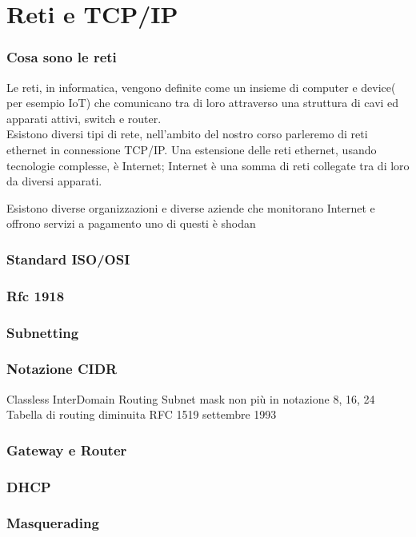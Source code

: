 \chapter{Reti e TCP/IP}	 %

\subsection{Cosa sono le reti}
Le reti, in informatica, vengono definite come un insieme di computer e device( per esempio IoT)  che comunicano tra di loro attraverso una struttura di cavi ed apparati attivi, switch e router.\\
Esistono diversi tipi di rete, nell'ambito del nostro corso parleremo di reti ethernet in connessione TCP/IP.
Una estensione delle reti ethernet, usando tecnologie complesse, è Internet; Internet è una somma di reti collegate tra di loro da diversi apparati.

Esistono diverse organizzazioni e diverse aziende che monitorano Internet e offrono servizi a pagamento uno di questi è shodan \cite{shodandeveloper} \cite{shodan}

\subsection{Standard ISO/OSI}

\subsection{Rfc 1918}

\subsection{Subnetting}

\subsection{Notazione CIDR}
Classless InterDomain Routing
Subnet mask non più in notazione 8, 16, 24
Tabella di routing diminuita
RFC 1519 settembre 1993

\subsection{Gateway e Router}

\subsection{DHCP}

\subsection{Masquerading}

